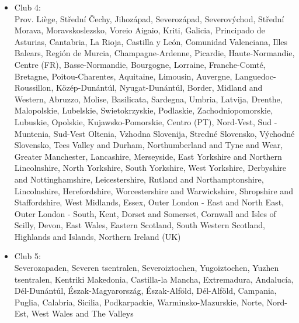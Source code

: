 \documentclass[11pt]{article}
\begin{document}
\begin{itemize}
\item Club 4: \\
 Prov. Liège, Střední Čechy, Jihozápad, Severozápad, Severovýchod, Střední Morava, Moravskoslezsko, Voreio Aigaio, Kriti, Galicia, Principado de Asturias, Cantabria, La Rioja, Castilla y León,                    Comunidad Valenciana, Illes Balears, Región de Murcia, Champagne-Ardenne, Picardie, Haute-Normandie, Centre (FR), Basse-Normandie,  Bourgogne, Lorraine, Franche-Comté, Bretagne, Poitou-Charentes, Aquitaine,          Limousin, Auvergne, Languedoc-Roussillon, Közép-Dunántúl, Nyugat-Dunántúl, Border, Midland and Western, Abruzzo,                Molise, Basilicata, Sardegna, Umbria, Latvija, Drenthe,                 Malopolskie, Lubelskie, Swietokrzyskie, Podlaskie,                  Zachodniopomorskie, Lubuskie, Opolskie, Kujawsko-Pomorskie, Centro (PT), Nord-Vest, Sud - Muntenia, Sud-Vest Oltenia, Vzhodna Slovenija, Stredné Slovensko, Východné Slovensko, Tees Valley and Durham, Northumberland and Tyne and Wear,  Greater Manchester, Lancashire, Merseyside, East Yorkshire and Northern Lincolnshire, North Yorkshire, South Yorkshire,  West Yorkshire, Derbyshire and Nottinghamshire, Leicestershire, Rutland and Northamptonshire, Lincolnshire, Herefordshire, Worcestershire and Warwickshire, Shropshire and Staffordshire, West Midlands, Essex, Outer London - East and North East, Outer London - South, Kent, Dorset and Somerset, Cornwall and Isles of Scilly, Devon, East Wales, Eastern Scotland, South Western Scotland, Highlands and Islands, Northern Ireland (UK)
\item Club 5:\\
Severozapaden, Severen tsentralen, Severoiztochen, Yugoiztochen, Yuzhen tsentralen, Kentriki Makedonia, Castilla-la Mancha, Extremadura, Andalucía, Dél-Dunántúl, Észak-Magyarország, Észak-Alföld, Dél-Alföld, Campania, Puglia, Calabria, Sicilia, Podkarpackie, Warminsko-Mazurskie, Norte, Nord-Est, West Wales and The Valleys

\end{itemize}



  
  
\end{document}
